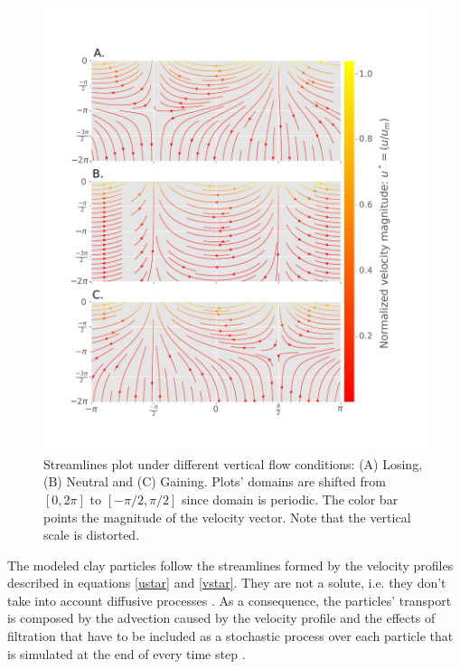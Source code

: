 \documentclass[draft,linenumbers]{agujournal2018}
\begin{document}
\begin{figure}[ht]
\centering
\includegraphics[trim=2cm 1.5cm 4cm 0.1cm, width=35pc]
{190131_Streamlines.pdf}
\caption{Streamlines plot under different vertical flow conditions: (A) Losing, (B) Neutral and (C) Gaining. Plots' domains are shifted from $[0, 2 \pi]$ to $[-\pi /2, \pi/2]$ since domain is periodic. The color bar points the magnitude of the velocity vector. Note that the vertical scale is distorted.}
\label{Velocities}
\end{figure}

The modeled clay particles follow the streamlines formed by the velocity profiles described in equations \ref{ustar} and \ref{vstar}. They are not a solute, i.e. they don't take into account diffusive processes \citep{Domenico1998}. As a consequence, the particles' transport is composed by the advection caused by the velocity profile and the effects of filtration that have to be included as a stochastic process over each particle that is simulated at the end of every time step \citep{Prickett1981}. 
\end{document}
